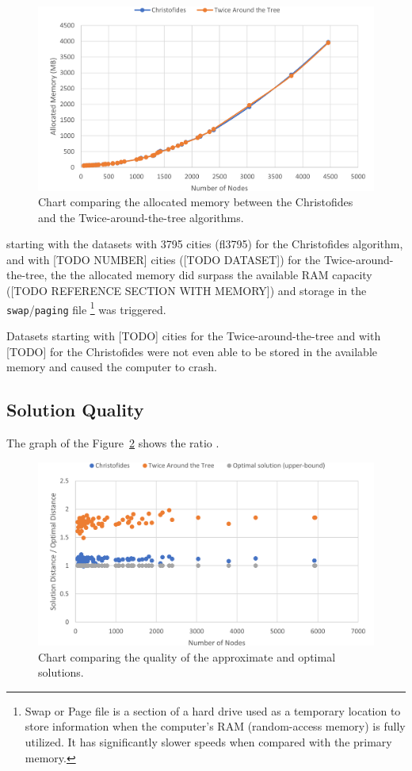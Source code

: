 \documentclass[12pt]{article}
\begin{document}
\begin{figure}[ht]
\centering
\includegraphics[height=.325\textheight]{memory_use_comparison.png}
\caption{Chart comparing the allocated memory between the Christofides and the Twice-around-the-tree algorithms.}
\label{fig:mem_use}
\end{figure}

starting with the datasets with 3795 cities (fl3795) for the Christofides algorithm, 
and with [TODO NUMBER] cities ([TODO DATASET]) for the Twice-around-the-tree, the the allocated memory did surpass 
the available RAM capacity ([TODO REFERENCE SECTION WITH MEMORY]) and storage in the \texttt{swap}/\texttt{paging} 
file 
\footnote{Swap or Page file is a section of a hard drive used as a temporary location to store information 
when the computer's RAM (random-access memory) is fully utilized. It has significantly slower speeds when 
compared with the primary memory.} 
was triggered.

Datasets starting with [TODO] cities for the Twice-around-the-tree and with [TODO] for the Christofides were 
not even able to be stored in the available memory and caused the computer to crash.


\subsection{Solution Quality}

The graph of the Figure~\ref{fig:quality_ratio} shows the ratio .

\begin{figure}[ht]
\centering
\includegraphics[height=.325\textheight]{quality_ratio.png}
\caption{Chart comparing the quality of the approximate and optimal solutions.}
\label{fig:quality_ratio}
\end{figure}
\end{document}
